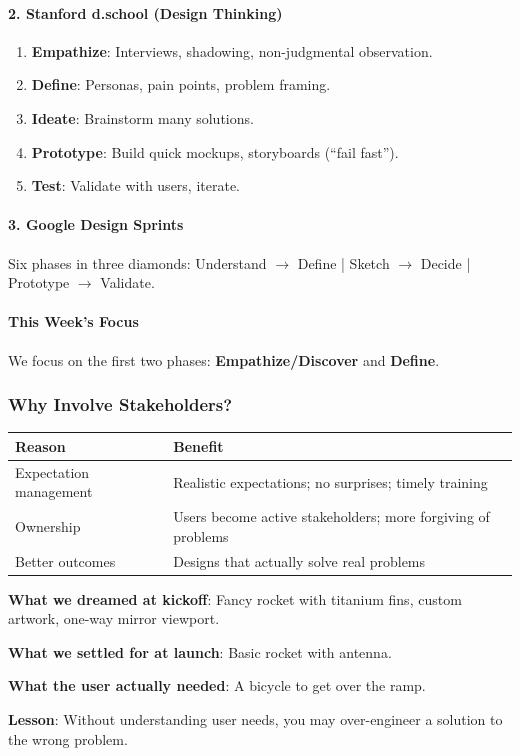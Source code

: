 \paragraph*{2. Stanford d.school (Design Thinking)}

\begin{enumerate}
  \item \textbf{Empathize}: Interviews, shadowing, non-judgmental observation.
  \item \textbf{Define}: Personas, pain points, problem framing.
  \item \textbf{Ideate}: Brainstorm many solutions.
  \item \textbf{Prototype}: Build quick mockups, storyboards (``fail fast'').
  \item \textbf{Test}: Validate with users, iterate.
\end{enumerate}

\paragraph*{3. Google Design Sprints}
Six phases in three diamonds: Understand $\to$ Define | Sketch $\to$ Decide | Prototype $\to$ Validate.

\paragraph*{This Week's Focus}
We focus on the first two phases: \textbf{Empathize/Discover} and \textbf{Define}.

\subsubsection*{Why Involve Stakeholders?}

\begin{center}
\renewcommand{\arraystretch}{1.3}
\begin{tabular}{@{} l p{8cm} @{}}
\toprule
\textbf{Reason} & \textbf{Benefit} \\
\midrule
Expectation management & Realistic expectations; no surprises; timely training \\
Ownership & Users become active stakeholders; more forgiving of problems \\
Better outcomes & Designs that actually solve real problems \\
\bottomrule
\end{tabular}
\end{center}

\begin{exbox}
\textbf{What we dreamed at kickoff}: Fancy rocket with titanium fins, custom artwork, one-way mirror viewport.

\textbf{What we settled for at launch}: Basic rocket with antenna.

\textbf{What the user actually needed}: A bicycle to get over the ramp.

\textbf{Lesson}: Without understanding user needs, you may over-engineer a solution to the wrong problem.
\end{exbox}

